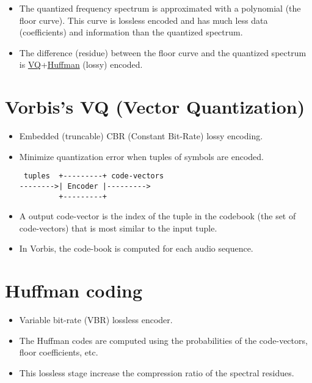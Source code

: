 \begin{itemize}
\item The quantized frequency spectrum is approximated with a
  polynomial (the floor curve). This curve is lossless encoded and has
  much less data (coefficients) and information than the quantized
  spectrum.
\item The difference (residue) between the floor curve and the
  quantized spectrum is
  \href{http://www.data-compression.com/vq.shtml}{VQ}+\href{../Text_Coding/index.html#x1-6900015}{Huffman}
  (lossy) encoded.
\end{itemize}


\section{Vorbis's VQ (Vector Quantization)}

\begin{itemize}
\item Embedded (truncable) CBR (Constant Bit-Rate) lossy encoding.
\item Minimize quantization error when tuples of symbols are encoded.
\begin{center}
\begin{verbatim}
 tuples  +---------+ code-vectors
-------->| Encoder |--------->
         +---------+
\end{verbatim}
\end{center}
\item A output code-vector is the index of the tuple in the codebook
  (the set of code-vectors) that is most similar to the input tuple.
\item In Vorbis, the code-book is computed for each audio sequence.
\end{itemize}


\section{Huffman coding}

\begin{itemize}
\item Variable bit-rate (VBR) lossless encoder.
\item The Huffman codes are computed using the probabilities of the
  code-vectors, floor coefficients, etc.
\item This lossless stage increase the compression ratio of the
  spectral residues.
\end{itemize}

